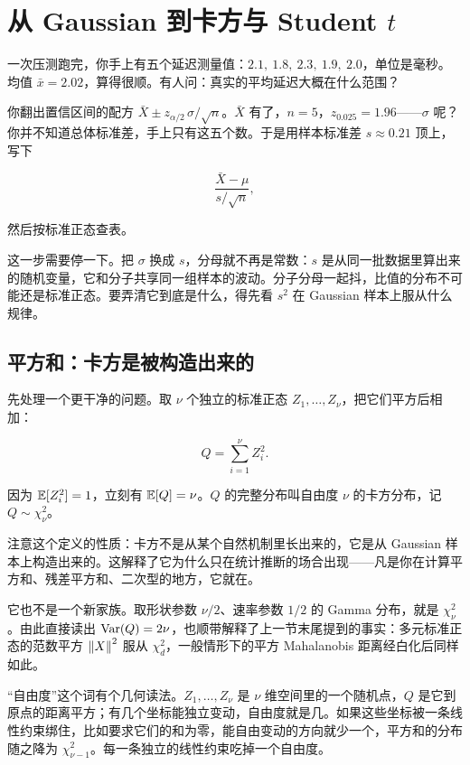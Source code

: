 \section{\texorpdfstring{从 Gaussian 到卡方与 Student \(t\)}{从 Gaussian 到卡方与 Student t}}
\label{sec:05-Probability/06-Common-Distributions/06}

一次压测跑完，你手上有五个延迟测量值：\(2.1,\ 1.8,\ 2.3,\ 1.9,\ 2.0\)，单位是毫秒。均值 \(\bar x=2.02\)，算得很顺。有人问：真实的平均延迟大概在什么范围？

你翻出置信区间的配方 \(\bar X\pm z_{\alpha/2}\,\sigma/\sqrt n\)。\(\bar X\) 有了，\(n=5\)，\(z_{0.025}=1.96\)——\(\sigma\) 呢？你并不知道总体标准差，手上只有这五个数。于是用样本标准差 \(s\approx0.21\) 顶上，写下

\[
\frac{\bar X-\mu}{s/\sqrt n},
\]

然后按标准正态查表。

这一步需要停一下。把 \(\sigma\) 换成 \(s\)，分母就不再是常数：\(s\) 是从同一批数据里算出来的随机变量，它和分子共享同一组样本的波动。分子分母一起抖，比值的分布不可能还是标准正态。要弄清它到底是什么，得先看 \(s^2\) 在 Gaussian 样本上服从什么规律。

\subsection{平方和：卡方是被构造出来的}

先处理一个更干净的问题。取 \(\nu\) 个独立的标准正态 \(Z_1,\ldots,Z_\nu\)，把它们平方后相加：

\[
Q=\sum_{i=1}^\nu Z_i^2 .
\]

因为 \(\mathbb{E}[Z_i^2]=1\)，立刻有 \(\mathbb{E}[Q]=\nu\)。\(Q\) 的完整分布叫自由度 \(\nu\) 的卡方分布，记 \(Q\sim\chi^2_\nu\)。

注意这个定义的性质：卡方不是从某个自然机制里长出来的，它是从 Gaussian 样本上构造出来的。这解释了它为什么只在统计推断的场合出现——凡是你在计算平方和、残差平方和、二次型的地方，它就在。

它也不是一个新家族。取形状参数 \(\nu/2\)、速率参数 \(1/2\) 的 Gamma 分布，就是 \(\chi^2_\nu\)。由此直接读出 \(\operatorname{Var}(Q)=2\nu\)，也顺带解释了上一节末尾提到的事实：多元标准正态的范数平方 \(\left\lVert X\right\rVert^2\) 服从 \(\chi^2_d\)，一般情形下的平方 Mahalanobis 距离经白化后同样如此。

``自由度''这个词有个几何读法。\(Z_1,\ldots,Z_\nu\) 是 \(\nu\) 维空间里的一个随机点，\(Q\) 是它到原点的距离平方；有几个坐标能独立变动，自由度就是几。如果这些坐标被一条线性约束绑住，比如要求它们的和为零，能自由变动的方向就少一个，平方和的分布随之降为 \(\chi^2_{\nu-1}\)。每一条独立的线性约束吃掉一个自由度。

